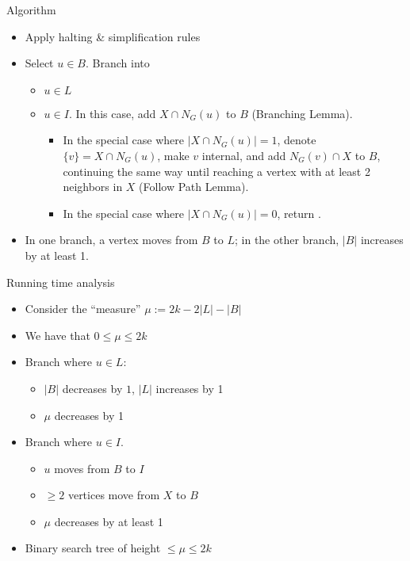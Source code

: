 \begin{frame}{Algorithm}

 \begin{itemize}
  \item Apply halting \& simplification rules
  \item Select $u\in B$. Branch into
  \begin{itemize}
   \item $u\in L$
   \item $u\in I$. In this case, add $X\cap N_G(u)$ to $B$ (Branching Lemma). 
   \begin{itemize}
    \item In the special case where $|X\cap N_G(u)|=1$, denote $\{v\}=X\cap N_G(u)$, make $v$ internal, and add $N_G(v)\cap X$ to $B$, continuing the same way until reaching a vertex with at least 2 neighbors in $X$ (Follow Path Lemma).
    \item In the special case where $|X\cap N_G(u)|=0$, return \No.
   \end{itemize}
  \end{itemize}
  \medskip
  \pause
  \item In one branch, a vertex moves from $B$ to $L$; in the other branch, $|B|$ increases by at least 1.
 \end{itemize}
\end{frame}


\begin{frame}{Running time analysis}
 
 \begin{itemize}
  \item Consider the ``measure'' $\mu := 2k - 2|L| - |B|$
  \item We have that $0 \le \mu \le 2k$
  \item Branch where $u\in L$:
   \begin{itemize}
    \item $|B|$ decreases by $1$, $|L|$ increases by 1
    \item $\mu$ decreases by 1
   \end{itemize}
  \item Branch where $u\in I$.
   \begin{itemize}
     \item $u$ moves from $B$ to $I$
     \item $\ge 2$ vertices move from $X$ to $B$
     \item $\mu$ decreases by at least 1
   \end{itemize}
 \end{itemize}
 \medskip
 \begin{itemize}
  \item Binary search tree of height $\le \mu \le 2k$
 \end{itemize}
\end{frame}

